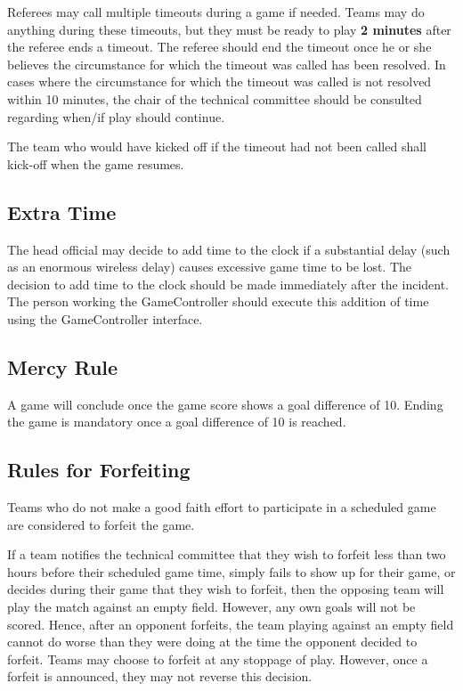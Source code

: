 Referees may call multiple timeouts during a game if needed.  Teams may do anything during these timeouts, but they must be ready to play \textbf{2 minutes} after the referee ends a timeout.  The referee should end the timeout once he or she believes the circumstance for which the timeout was called has been resolved.  In cases where the circumstance for which the timeout was called is not resolved within 10 minutes, the chair of the technical committee should be consulted regarding when/if play should continue.

The team who would have kicked off if the timeout had not been called shall kick-off when the game resumes.

\subsection{Extra Time}
\label{sec:extra_time}
The head official may decide to add time to the clock if a substantial delay (such as an enormous wireless delay) causes excessive game time to be lost.  The decision to add time to the clock should be made immediately after the incident.  The person working the GameController should execute this addition of time using the GameController interface.

\subsection{Mercy Rule}
\label{sec:mercy_rule}
A game will conclude once the game score shows a goal difference of 10.  Ending the game is mandatory once a goal difference of 10 is reached.

\subsection{Rules for Forfeiting}
\label{sec:forfeit}

Teams who do not make a good faith effort to participate in a scheduled game are considered to forfeit the game.

If a team notifies the technical committee that they wish to forfeit less than two hours before their scheduled game time, simply fails to show up for their game, or decides during their game that they wish to forfeit, then the opposing team will play the match against an empty field.  However, any own goals will not be scored.  Hence, after an opponent forfeits, the team playing against an empty field cannot do worse than they were doing at the time the opponent decided to forfeit.  Teams may choose to forfeit at any stoppage of play.  However, once a forfeit is announced, they may not reverse this decision.

